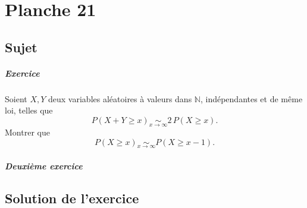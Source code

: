 \chapter{Planche 21}

\section{Sujet}

\paragraph{Exercice}

Soient $X,Y$ deux variables aléatoires à valeurs dans $\mathbb N$, indépendantes et de même loi, telles que
$$
P(X+Y \geqslant x) \underset{x\to\infty}\sim 2\,P(X \geqslant x).
$$
Montrer que
$$
P(X \geqslant x) \underset{x\to\infty}\sim P(X \geqslant x-1).
$$

\paragraph{Deuxième exercice}

\section{Solution de l'exercice}